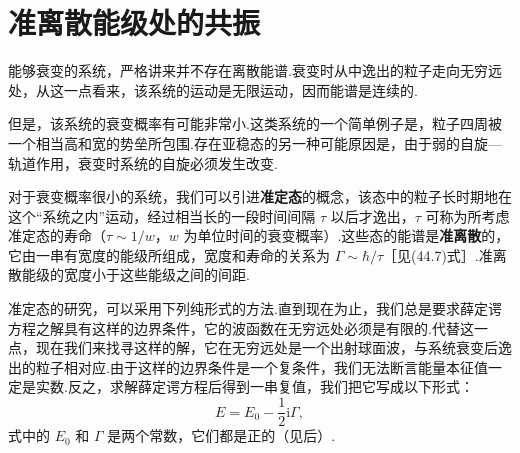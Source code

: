 \section{准离散能级处的共振}

能够衰变的系统，严格讲来并不存在离散能谱.衰变时从中逸出的粒子走向无穷远处，从这一点看来，该系统的运动是无限运动，因而能谱是连续的.

但是，该系统的衰变概率有可能非常小.这类系统的一个简单例子是，粒子四周被一个相当高和宽的势垒所包围.存在亚稳态的另一种可能原因是，由于弱的自旋—轨道作用，衰变时系统的自旋必须发生改变.

对于衰变概率很小的系统，我们可以引进\textbf{准定态}的概念，该态中的粒子长时期地在这个“系统之内”运动，经过相当长的一段时间间隔 $\tau$ 以后才逸出，$\tau$ 可称为所考虑准定态的寿命（$\tau\sim1/w$，$w$ 为单位时间的衰变概率）.这些态的能谱是\textbf{准离散}的，它由一串有宽度的能级所组成，宽度和寿命的关系为 $\Gamma\sim\hbar/\tau$［见(44.7)式］.准离散能级的宽度小于这些能级之间的间距.

准定态的研究，可以采用下列纯形式的方法.直到现在为止，我们总是要求薛定谔方程之解具有这样的边界条件，它的波函数在无穷远处必须是有限的.代替这一点，现在我们来找寻这样的解，它在无穷远处是一个出射球面波，与系统衰变后逸出的粒子相对应.由于这样的边界条件是一个复条件，我们无法断言能量本征值一定是实数.反之，求解薛定谔方程后得到一串复值，我们把它写成以下形式：
\begin{equation}
  E=E_0-\frac{1}{2}\mathrm{i}\Gamma,
\end{equation}
式中的 $E_0$ 和 $\Gamma$ 是两个常数，它们都是正的（见后）.

